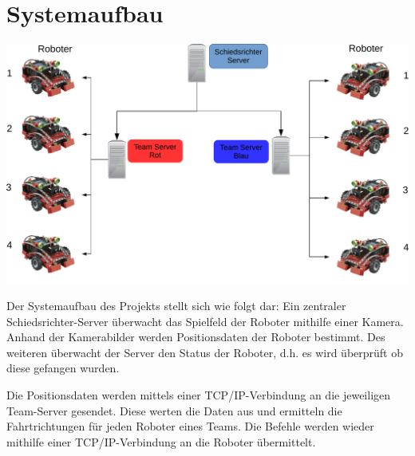 \section{Systemaufbau}
\begin{center}
	\includegraphics[scale=0.5]{Bilder/Systemaufbau.pdf}
\end{center}
Der Systemaufbau des Projekts stellt sich wie folgt dar:
\newline
Ein zentraler Schiedsrichter-Server überwacht das Spielfeld der Roboter mithilfe einer Kamera. Anhand der Kamerabilder werden Positionsdaten der Roboter bestimmt. Des weiteren überwacht der Server den Status der Roboter, d.h. es wird überprüft ob diese gefangen wurden.

Die Positionsdaten werden mittels einer TCP/IP-Verbindung an die jeweiligen Team-Server gesendet. Diese werten die Daten aus und ermitteln die Fahrtrichtungen für jeden Roboter eines Teams. Die Befehle werden wieder mithilfe einer TCP/IP-Verbindung an die Roboter übermittelt.


